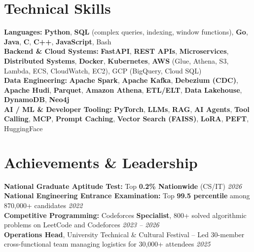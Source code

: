 \documentclass[10pt]{article}
\begin{document}
\section*{Technical Skills}
\textbf{Languages:} \textbf{Python}, \textbf{SQL} (complex queries, indexing, window functions), \textbf{Go}, \textbf{Java}, \textbf{C}, \textbf{C++}, \textbf{JavaScript}, Bash \\
\textbf{Backend \& Cloud Systems:} \textbf{FastAPI}, \textbf{REST APIs}, \textbf{Microservices}, \textbf{Distributed Systems}, \textbf{Docker}, \textbf{Kubernetes}, \textbf{AWS} (Glue, Athena, S3, Lambda, ECS, CloudWatch, EC2), GCP (BigQuery, Cloud SQL) \\
\textbf{Data Engineering:} \textbf{Apache Spark}, \textbf{Apache Kafka}, \textbf{Debezium (CDC)}, \textbf{Apache Hudi}, \textbf{Parquet}, \textbf{Amazon Athena}, \textbf{ETL/ELT}, \textbf{Data Lakehouse}, \textbf{DynamoDB}, \textbf{Neo4j} \\
\textbf{AI / ML \& Developer Tooling:} \textbf{PyTorch}, \textbf{LLMs}, \textbf{RAG}, \textbf{AI Agents}, \textbf{Tool Calling}, \textbf{MCP}, \textbf{Prompt Caching}, \textbf{Vector Search (FAISS)}, \textbf{LoRA}, \textbf{PEFT}, HuggingFace
\vspace{-0.35em}

\section*{Achievements \& Leadership}
\textbf{National Graduate Aptitude Test:} Top \textbf{0.2\% Nationwide} (CS/IT) \hfill \textit{2026} \\[0.1em]
\textbf{National Engineering Entrance Examination:} Top \textbf{99.5 percentile} among 870,000+ candidates \hfill \textit{2022} \\[0.1em]
\textbf{Competitive Programming:} Codeforces \textbf{Specialist}, 800+ solved algorithmic problems on LeetCode and Codeforces \hfill \textit{2023 -- 2026} \\[0.1em]
\textbf{Operations Head}, University Technical & Cultural Festival -- Led 30-member cross-functional team managing logistics for 30,000+ attendees \hfill \textit{2025}
\end{document}
